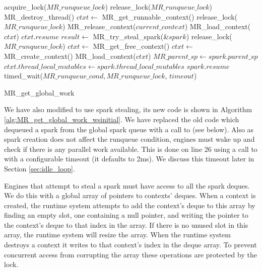 \begin{algorithm}
\begin{algorithmic}[1]
  \State acquire\_lock($MR\_runqueue\_lock$)
  \Loop
      \State release\_lock($MR\_runqueue\_lock$)
      \State MR\_destroy\_thread()
    \EndIf
    \State $ctxt \gets$ MR\_get\_runnable\_context()
      \State release\_lock($MR\_runqueue\_lock$)
        \State MR\_release\_context($current\_context$)
      \EndIf
      \State MR\_load\_context($ctxt$)
      \Goto $ctxt.resume$
    \EndIf
      \State $result \gets$ MR\_try\_steal\_spark(\&$spark$)
        \State release\_lock($MR\_runqueue\_lock$)
          \State $ctxt \gets$ MR\_get\_free\_context()
            \State $ctxt \gets$ MR\_create\_context()
          \EndIf
          \State MR\_load\_context($ctxt$)
        \EndIf
        \State $MR\_parent\_sp \gets spark.parent\_sp$
        \State $ctxt.thread\_local\_mutables \gets
          spark.thread\_local\_mutables$
        \Goto $spark.resume$
      \EndIf
    \EndIf
    \State timed\_wait($MR\_runqueue\_cond, MR\_runqueue\_lock$, $timeout$)
  \EndLoop
\EndProcedure
\end{algorithmic}
\caption{MR\_get\_global\_work}
\label{alg:MR_get_global_work_wsinitial}
\end{algorithm}

We have also modified \getglobalwork to use spark stealing,
its new code is shown in Algorithm \ref{alg:MR_get_global_work_wsinitial}.
We have replaced the old code which dequeued a spark from the global spark
queue
with a call to \trystealspark (see below).
Also as spark creation does not affect the runqueue condition,
engines must wake up and check if there is any parallel work available.
This is done on line 26 using a call to  with a
configurable timeout (it defaults to 2ms).
We discuss this timeout later in Section \ref{sec:idle_loop}.

Engines that attempt to steal a spark must have access to all the spark
deques.
We do this with a global array of pointers to contexts' deques.
When a context is created,
the runtime system attempts to add the context's deque to this array by
finding an empty slot,
one containing a null pointer,
and writing the pointer to the context's deque to that index in the array.
If there is no unused slot in this array, the runtime system will resize the
array.
When the runtime system destroys a context it writes \NULL to that context's
index in the deque array.
To prevent concurrent access from corrupting the array these operations are
protected by the  lock.

